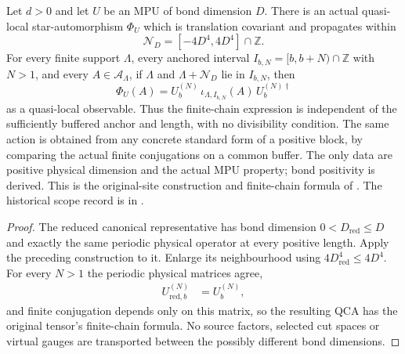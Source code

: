 \begin{theorem}
    \label{thm:mpu_actual_qca}
    \leanok
    Let $d>0$ and let $U$ be an MPU of bond dimension $D$.
    There is an actual quasi-local star-automorphism $\Phi_U$ which is
    translation covariant and propagates within
    \[
        \mathcal N_D=[-4D^4,4D^4]\cap\mathbb Z.
    \]
    For every finite support $\Lambda$, every anchored interval
    $I_{b,N}=[b,b+N)\cap\mathbb Z$ with $N>1$, and every
    $A\in\mathcal A_\Lambda$, if $\Lambda$ and
    $\Lambda+\mathcal N_D$ lie in $I_{b,N}$, then
    \[
        \Phi_U(A)=U_b^{(N)}\,\iota_{\Lambda,I_{b,N}}(A)\,
        U_b^{(N)\dagger}
    \]
    as a quasi-local observable. Thus the finite-chain expression is
    independent of the sufficiently buffered anchor and length,
    with no divisibility condition. The same action is obtained from
    any concrete standard form of a positive block, by comparing the
    actual finite conjugations on a common buffer. The only data are positive physical
    dimension and the actual MPU property; bond positivity is derived.
    This is the original-site construction and finite-chain formula of
    \cite[lines~2292--2306]{Cirac2017MPU}. The historical scope record
    is in \cite{gap:mpu_qca_complete_block_heisenberg_scope}.
\end{theorem}
\begin{proof}
    \leanok
    The reduced canonical representative has bond dimension
    $0<D_{\mathrm{red}}\le D$ and exactly the same periodic physical
    operator at every positive length. Apply the preceding construction
    to it. Enlarge its neighbourhood using
    $4D_{\mathrm{red}}^4\le4D^4$. For every $N>1$ the periodic
    physical matrices agree,
    \begin{align}
        U_{\mathrm{red},b}^{(N)} & =U_b^{(N)},
        \label{eq:mpu_actual_qca_reduced_matrix}
    \end{align}
    and finite conjugation depends only on this matrix, so the
    resulting QCA has the original tensor's finite-chain formula. No source factors, selected cut
    spaces or virtual gauges are transported between the possibly
    different bond dimensions.
\end{proof}
